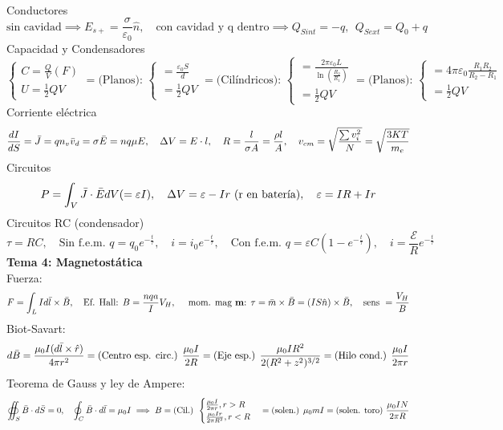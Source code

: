 \documentclass{article}
\newcommand{\h}{\hspace{1em}}
\renewcommand{\t}[1]{\text{#1}}
\begin{document}
\\
Conductores\\
\[\text{sin cavidad} \implies E_{s+} = \frac{\sigma}{\varepsilon_0}\hat{n}, \hspace{1em}  \text{con cavidad y q dentro} \implies Q_{Sint} = -q, \ \  Q_{Sext} = Q_0+q\]
Capacidad y Condensadores\\
\[
\begin{cases} C=\frac{Q}{V}(F) \\U  = \frac{1}{2}QV \end{cases} = 
\text{(Planos): } \begin{cases} = \frac{\varepsilon_0 S}{d} \\ = \frac{1}{2}QV \end{cases} = 
\text{(Cilíndricos): } \begin{cases} = \frac{2\pi \varepsilon_0 L}{\ln(\frac{R_2}{R_1})} \\
= \frac{1}{2}QV \end{cases}=
\text{(Planos): } \begin{cases}  = 4\pi\varepsilon_0\frac{R_1R_2}{R_2-R_1} \\ =  \frac{1}{2}QV \end{cases}
\]
Corriente eléctrica 
\[\frac{dI}{dS} = \Bar{J} = qn_v\Bar{v}_d = \sigma\Bar{E} = nq\mu E, \h \Delta V=E\cdot l, \h R=\frac{l}{\sigma A} = \frac{\rho l}{A} ,\h  v_{cm} = \sqrt{\frac{\sum v_i^2}{N}}=\sqrt{\frac{3KT}{m_e}}\]
Circuitos
\[P = \int_V \Bar{J}\cdot \Bar{E}dV (=\varepsilon I), \h \Delta V= \varepsilon - Ir \text{ (r en batería)}, \h \varepsilon=IR+Ir\]
Circuitos RC (condensador)
$$\tau = RC, \h \text{Sin f.e.m. }q = q_0e^{-\frac{t}{\tau}}, \h i = i_0e^{-\frac{t}{\tau}}, \h \t{Con f.e.m. } q = \varepsilon C (1-e^{-\frac{t}{\tau}}), \h i = \frac{\mathcal{E}}{R}e^{-\frac{t}{\tau}}  $$
\textbf{Tema 4: Magnetostática}\\
Fuerza:
$$F=\int_L Id\Bar{l}\times \Bar{B}, \h \text{Ef. Hall: } B= \frac{nqa}{I}V_H, \h \t{ mom. mag \textbf{m}:  } \tau = \Bar{m}\times \Bar{B}=(IS\hat{n})\times  \Bar{B}, \h \text{sens } = \frac{V_H}{B}$$
Biot-Savart:
$$
d\Bar{B}=\frac{\mu_0 I(d\Bar{l}\times \hat{r})}{4\pi r^2} = \t{(Centro esp. circ.) } \frac{\mu_0I}{2R} =  \t{(Eje esp.) }\frac{\mu_0IR^2}{2(R^2 + z^2)^{3/2}} = \t{(Hilo cond.) } \frac{\mu_0I}{2\pi r}
$$
Teorema de Gauss y ley de Ampere:
$$
\oiint_S \Bar{B}\cdot d\Bar{S}=0, \h \oint_C \Bar{B}\cdot d\Bar{l}=\mu_0I \implies B=\t{(Cil.) } \begin{cases}
    \frac{\mu_0I}{2\pi r}, r>R \\
    \frac{\mu_0Ir}{2\pi R^2}, r<R
\end{cases} = \t{(solen.) }\mu_0mI = \t{(solen. toro) } \frac{\mu_0IN}{2\pi R}
$$
\end{document}
